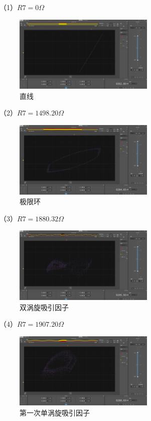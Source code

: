 \documentclass[10pt,a4paper,twoside,UTF8]{ctexart}
\begin{document}
（1）$R7=0\Omega$
\begin{figure}[H]
	\centering
	\includegraphics[width=0.6\textwidth]{C9.2/line.PNG}
	\caption{直线}	
\end{figure}
（2）$R7=1498.20\Omega$
\begin{figure}[H]
	\centering
	\includegraphics[width=0.6\textwidth]{C9.2/limit ring.PNG}
	\caption{极限环}	
\end{figure}
（3）$R7=1880.32\Omega$
\begin{figure}[H]
	\centering
	\includegraphics[width=0.6\textwidth]{C9.2/2.PNG}
	\caption{双涡旋吸引因子}	
\end{figure}
（4）$R7=1907.20\Omega$
\begin{figure}[H]
	\centering
	\includegraphics[width=0.6\textwidth]{C9.2/1st.PNG}
	\caption{第一次单涡旋吸引因子}	
\end{figure}
\end{document}
